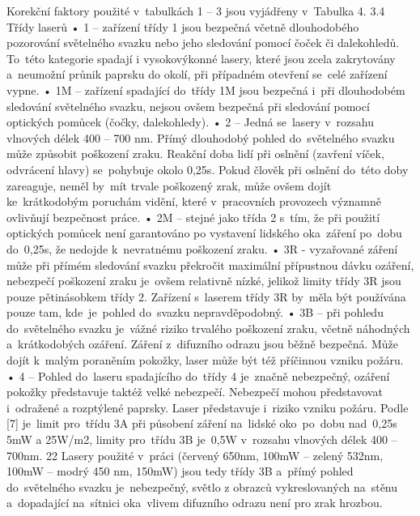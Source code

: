 Korekční faktory použité v~tabulkách 1 – 3 jsou vyjádřeny v~Tabulka 4.
3.4 Třídy laserů
• 1 – zařízení třídy 1 jsou bezpečná včetně dlouhodobého pozorování světelného
svazku nebo jeho sledování pomocí čoček či dalekohledů. To~této kategorie spadají
i vysokovýkonné lasery, které jsou zcela zakrytovány a~neumožní průnik paprsku
do okolí, při případném otevření se~celé zařízení vypne.
• 1M – zařízení spadající do~třídy 1M jsou bezpečná i~při dlouhodobém sledování
světelného svazku, nejsou ovšem bezpečná při sledování pomocí optických
pomůcek (čočky, dalekohledy).
• 2 – Jedná se~lasery v~rozsahu vlnových délek 400 – 700 nm. Přímý dlouhodobý
pohled do~světelného svazku může způsobit poškození zraku. Reakční doba lidí při
oslnění (zavření víček, odvrácení hlavy) se~pohybuje okolo 0,25s. Pokud člověk při
oslnění do~této doby zareaguje, neměl by~mít trvale poškozený zrak, může ovšem
dojít ke~krátkodobým poruchám vidění, které v~pracovních provozech významně
ovlivňují bezpečnost práce.
• 2M – stejné jako třída 2 s~tím, že při použití optických pomůcek není garantováno
po vystavení lidského oka~záření po~dobu do~0,25s, že nedojde k~nevratnému
poškození zraku.
• 3R - vyzařované záření může při přímém sledování svazku překročit maximální
přípustnou dávku ozáření, nebezpečí poškození zraku je~ovšem relativně nízké,
jelikož limity třídy 3R jsou pouze pětinásobkem třídy 2. Zařízení s~laserem třídy
3R by~měla být používána pouze tam, kde~je~pohled do~svazku nepravděpodobný.
• 3B – při pohledu do~světelného svazku je~vážné riziko trvalého poškození zraku,
včetně náhodných a~krátkodobých ozáření. Záření z~difuzního odrazu jsou běžně
bezpečná. Může dojít k~malým poraněním pokožky, laser může být též příčinnou
vzniku požáru.
• 4 – Pohled do~laseru spadajícího do~třídy 4 je~značně nebezpečný, ozáření pokožky
představuje taktéž velké nebezpečí. Nebezpečí mohou představovat i~odražené a
rozptýlené paprsky. Laser představuje i~riziko vzniku požáru.
Podle [7] je~limit pro~třídu 3A při působení záření na~lidské oko~po~dobu nad~0,25s 5mW a
25W/m2, limity pro~třídu 3B je~0,5W v~rozsahu vlnových délek 400 – 700nm.
22
Lasery použité v~práci (červený 650nm, 100mW – zelený 532nm, 100mW – modrý 450
nm, 150mW) jsou tedy třídy 3B a~přímý pohled do~světelného svazku je~nebezpečný, světlo z
obrazců vykreslovaných na~stěnu a~dopadající na~sítnici oka~vlivem difuzního odrazu není pro
zrak hrozbou.